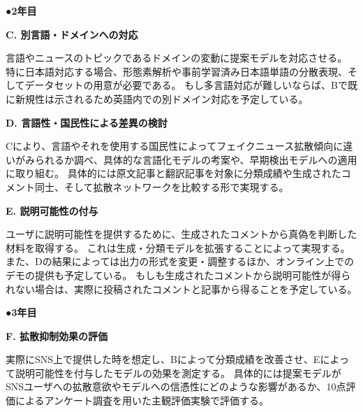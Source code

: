 {	%


	\noindent
	●\textbf{2年目}

	\noindent
	\textbf{C. 別言語・ドメインへの対応}

	言語やニュースのトピックであるドメインの変動に提案モデルを対応させる。
	特に日本語対応する場合、形態素解析や事前学習済み日本語単語の分散表現、そしてデータセットの用意が必要である。
	もし多言語対応が難しいならば、Bで既に新規性は示されるため英語内での別ドメイン対応を予定している。

	\noindent
	\textbf{D. 言語性・国民性による差異の検討}

	Cにより、言語やそれを使用する国民性によってフェイクニュース拡散傾向に違いがみられるか調べ、具体的な⾔語化モデルの考案や、早期検出モデルへの適⽤に取り組む。
	具体的には原文記事と翻訳記事を対象に分類成績や生成されたコメント同士、そして拡散ネットワークを比較する形で実現する。

	\noindent
	\textbf{E. 説明可能性の付与}

	ユーザに説明可能性を提供するために、生成されたコメントから真偽を判断した材料を取得する。
	これは生成・分類モデルを拡張することによって実現する。
	また、Dの結果によっては出力の形式を変更・調整するほか、オンライン上でのデモの提供も予定している。
	もしも生成されたコメントから説明可能性が得られない場合は、実際に投稿されたコメントと記事から得ることを予定している。

	\noindent
	●\textbf{3年目}

	\noindent
	\textbf{F. 拡散抑制効果の評価}

	実際にSNS上で提供した時を想定し、Bによって分類成績を改善させ、Eによって説明可能性を付与したモデルの効果を測定する。
	具体的には提案モデルがSNSユーザへの拡散意欲やモデルへの信憑性にどのような影響があるか、10点評価によるアンケート調査を用いた主観評価実験で評価する。

}


